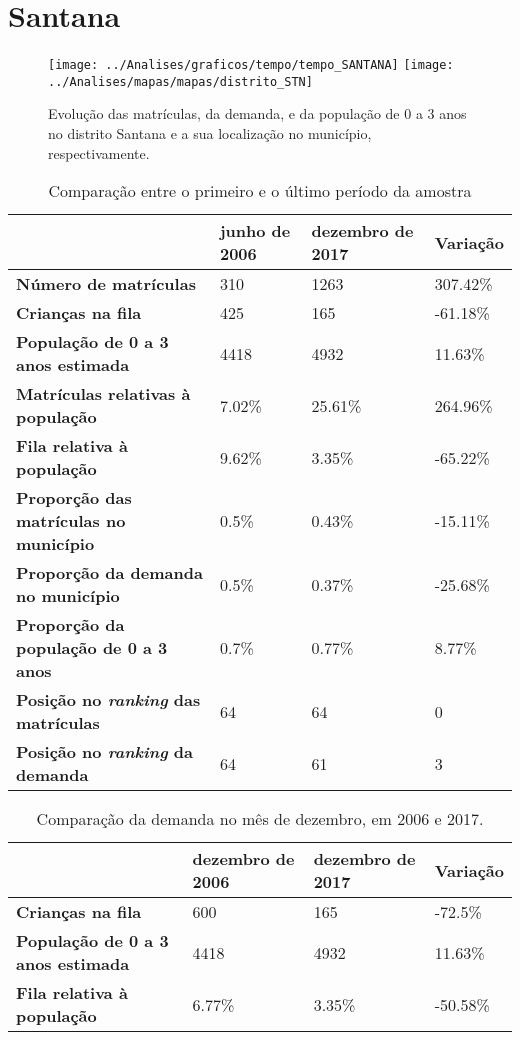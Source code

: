 \section{Santana}
\begin{figure}[H]
	\centering
	\texttt{[image: ../Analises/graficos/tempo/tempo\_SANTANA]}
	\texttt{[image: ../Analises/mapas/mapas/distrito\_STN]}
	\caption{Evolução das matrículas, da demanda, e da população de 0 a 3 anos no distrito Santana e a sua localização no município, respectivamente.}
\end{figure}
\begin{table}[H]
	\begin{tabular}{|l|l|l|l|}
		\hline
		\textbf{}                                      & \textbf{junho de 2006}       & \textbf{dezembro de 2017}    & \textbf{Variação} \\ \hline
		\textbf{Número de matrículas}                  & 310 & 1263 & 307.42\% \\ \hline
		\textbf{Crianças na fila}                      & 425 & 165 & -61.18\% \\ \hline
		\textbf{População de 0 a 3 anos estimada}      & 4418 & 4932 & 11.63\% \\ \hline
		\textbf{Matrículas relativas à população}      & 7.02\% & 25.61\% & 264.96\% \\ \hline
		\textbf{Fila relativa à população}             & 9.62\% & 3.35\% & -65.22\% \\ \hline
		\textbf{Proporção das matrículas no município} & 0.5\% & 0.43\% & -15.11\% \\ \hline
		\textbf{Proporção da demanda no município}     & 0.5\% & 0.37\% & -25.68\% \\ \hline
		\textbf{Proporção da população de 0 a 3 anos}  & 0.7\% & 0.77\% & 8.77\% \\ \hline
		\textbf{Posição no \textit{ranking} das matrículas}     & 64 & 64 & 0 \\ \hline
		\textbf{Posição no \textit{ranking} da demanda}         & 64 & 61 & 3 \\ \hline
	\end{tabular}
	\caption{Comparação entre o primeiro e o último período da amostra}
\end{table}
\begin{table}[H]
	\begin{tabular}{|l|l|l|l|}
		\hline
		\textbf{}                                 & \textbf{dezembro de 2006} & \textbf{dezembro de 2017} & \textbf{Variação} \\ \hline
		\textbf{Crianças na fila}                      & 600 & 165 & -72.5\% \\ \hline
		\textbf{População de 0 a 3 anos estimada}      & 4418 & 4932 & 11.63\% \\ \hline
		\textbf{Fila relativa à população}             & 6.77\% & 3.35\% & -50.58\% \\ \hline
	\end{tabular}
	\caption{Comparação da demanda no mês de dezembro, em 2006 e 2017.}
\end{table}
